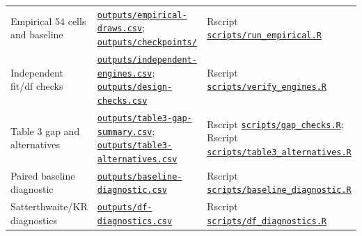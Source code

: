 \documentclass[11pt]{article}
\begin{document}
\begin{longtable}{>{\raggedright\arraybackslash}p{.22\linewidth}>{\raggedright\arraybackslash}p{.35\linewidth}>{\raggedright\arraybackslash}p{.35\linewidth}}
Empirical 54 cells and baseline&\href{https://github.com/alectionary/vibe-math/blob/master/formalization/kupzyk-power-assumptions/outputs/empirical-draws.csv}{\nolinkurl{outputs/empirical-draws.csv}}; \href{https://github.com/alectionary/vibe-math/tree/master/formalization/kupzyk-power-assumptions/outputs/checkpoints/}{\nolinkurl{outputs/checkpoints/}}&Rscript \href{https://github.com/alectionary/vibe-math/blob/master/formalization/kupzyk-power-assumptions/scripts/run_empirical.R}{\nolinkurl{scripts/run_empirical.R}}\\
Independent fit/df checks&\href{https://github.com/alectionary/vibe-math/blob/master/formalization/kupzyk-power-assumptions/outputs/independent-engines.csv}{\nolinkurl{outputs/independent-engines.csv}}; \href{https://github.com/alectionary/vibe-math/blob/master/formalization/kupzyk-power-assumptions/outputs/design-checks.csv}{\nolinkurl{outputs/design-checks.csv}}&Rscript \href{https://github.com/alectionary/vibe-math/blob/master/formalization/kupzyk-power-assumptions/scripts/verify_engines.R}{\nolinkurl{scripts/verify_engines.R}}\\
Table 3 gap and alternatives&\href{https://github.com/alectionary/vibe-math/blob/master/formalization/kupzyk-power-assumptions/outputs/table3-gap-summary.csv}{\nolinkurl{outputs/table3-gap-summary.csv}}; \href{https://github.com/alectionary/vibe-math/blob/master/formalization/kupzyk-power-assumptions/outputs/table3-alternatives.csv}{\nolinkurl{outputs/table3-alternatives.csv}}&Rscript \href{https://github.com/alectionary/vibe-math/blob/master/formalization/kupzyk-power-assumptions/scripts/gap_checks.R}{\nolinkurl{scripts/gap_checks.R}}; Rscript \href{https://github.com/alectionary/vibe-math/blob/master/formalization/kupzyk-power-assumptions/scripts/table3_alternatives.R}{\nolinkurl{scripts/table3_alternatives.R}}\\
Paired baseline diagnostic&\href{https://github.com/alectionary/vibe-math/blob/master/formalization/kupzyk-power-assumptions/outputs/baseline-diagnostic.csv}{\nolinkurl{outputs/baseline-diagnostic.csv}}&Rscript \href{https://github.com/alectionary/vibe-math/blob/master/formalization/kupzyk-power-assumptions/scripts/baseline_diagnostic.R}{\nolinkurl{scripts/baseline_diagnostic.R}}\\
Satterthwaite/KR diagnostics&\href{https://github.com/alectionary/vibe-math/blob/master/formalization/kupzyk-power-assumptions/outputs/df-diagnostics.csv}{\nolinkurl{outputs/df-diagnostics.csv}}&Rscript \href{https://github.com/alectionary/vibe-math/blob/master/formalization/kupzyk-power-assumptions/scripts/df_diagnostics.R}{\nolinkurl{scripts/df_diagnostics.R}}\\

\end{longtable}
\end{document}
